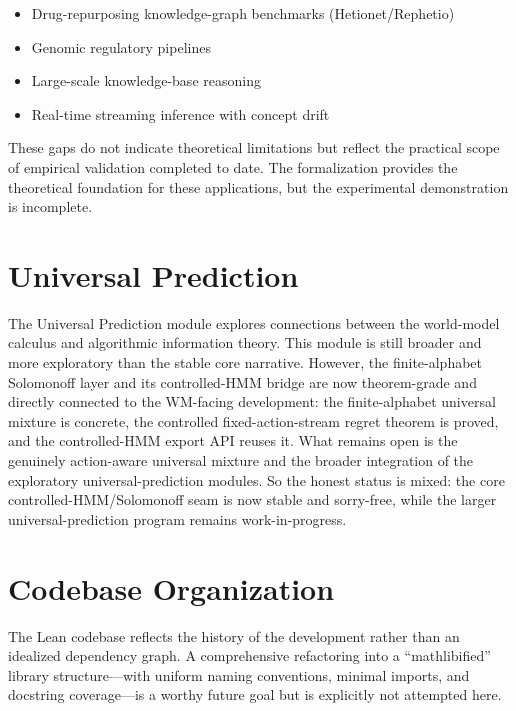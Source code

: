 \documentclass[11pt,openany]{report}
\begin{document}
\begin{itemize}
\item Drug-repurposing knowledge-graph benchmarks
  (Hetionet/Rephetio)
\item Genomic regulatory pipelines
\item Large-scale knowledge-base reasoning
\item Real-time streaming inference with concept drift
\end{itemize}

\noindent
These gaps do not indicate theoretical limitations but reflect the
practical scope of empirical validation completed to date.  The
formalization provides the theoretical foundation for these
applications, but the experimental demonstration is incomplete.

\section{Universal Prediction}

The Universal Prediction module explores connections between the
world-model calculus and algorithmic information theory.  This module
is still broader and more exploratory than the stable core narrative.
However, the finite-alphabet Solomonoff layer and its controlled-HMM
bridge are now theorem-grade and directly connected to the WM-facing
development: the finite-alphabet universal mixture is concrete, the
controlled fixed-action-stream regret theorem is proved, and the
controlled-HMM export API reuses it.  What remains open is the
genuinely action-aware universal mixture and the broader integration of
the exploratory universal-prediction modules.  So the honest status is
mixed: the core controlled-HMM/Solomonoff seam is now stable and
sorry-free, while the larger universal-prediction program remains
work-in-progress.

\section{Codebase Organization}

The Lean codebase reflects the history of the development rather than
an idealized dependency graph.  A comprehensive refactoring into a
``mathlibified'' library structure---with uniform naming conventions,
minimal imports, and docstring coverage---is a worthy future goal but
is explicitly not attempted here.


\end{document}
